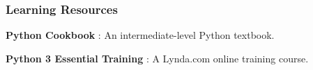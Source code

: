 \documentclass{article}
\begin{document}
\subsubsection*{Learning Resources}
\begin{itemize*}
    \item \textbf{Python Cookbook} \cite{cookbook}: An intermediate-level Python textbook.
    \item \textbf{Python 3 Essential Training} \cite{lynda}: A Lynda.com online training course.
\end{itemize*}


\newpage


% 
%
\end{document}
